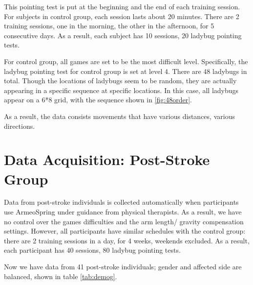 This pointing test is put at the beginning and the end of each training session. For subjects in control group, each session lasts about 20 minutes. There are 2 training sessions, one in the morning, the other in the afternoon, for 5 consecutive days. As a result, each subject has 10 sessions, 20 ladybug pointing tests. 

For control group, all games are set to be the most difficult level. Specifically, the ladybug pointing test for control group is set at level 4. There are 48 ladybugs in total. Though the locations of ladybugs seem to be random, they are actually appearing in a specific sequence at specific locations. In this case, all ladybugs appear on a 6*8 grid, with the sequence shown in \ref{fig:48order}.

As a result, the data consists movements that have various distances, various directions.

\section{Data Acquisition: Post-Stroke Group}

Data from post-stroke individuals is collected automatically when participants use ArmeoSpring under guidance from physical therapists. As a result, we have no control over the games difficulties and the arm length/ gravity compensation settings. However, all participants have similar schedules with the control group: there are 2 training sessions in a day, for 4 weeks, weekends excluded. As a result, each participant has 40 sessions, 80 ladybug pointing tests.

Now we have data from 41 post-stroke individuals; gender and affected side are balanced, shown in table \ref{tab:demog}. 